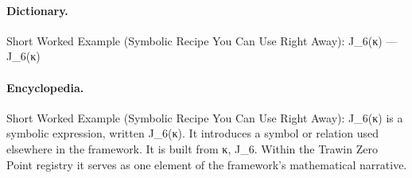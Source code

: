 \paragraph{Dictionary.}
Short Worked Example (Symbolic Recipe You Can Use Right Away): J\_6(κ) — J\_6(κ)

\paragraph{Encyclopedia.}
Short Worked Example (Symbolic Recipe You Can Use Right Away): J\_6(κ) is a symbolic expression, written J\_6(κ). It introduces a symbol or relation used elsewhere in the framework. It is built from κ, J\_6. Within the Trawin Zero Point registry it serves as one element of the framework's mathematical narrative.
